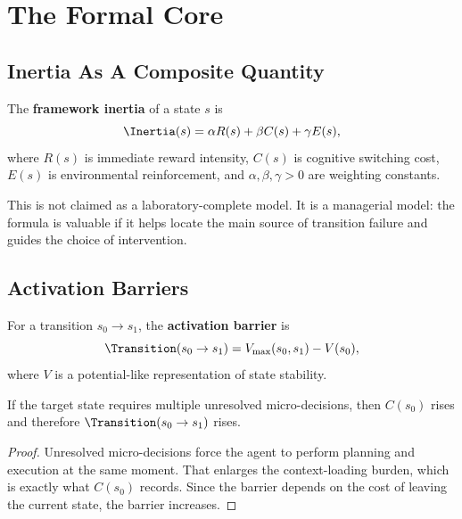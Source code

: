 \section{The Formal Core}
\label{sec:formal-core}

\subsection{Inertia As A Composite Quantity}

\begin{definition}
The \textbf{framework inertia} of a state $s$ is
\[
  \Inertia(s) = \alpha R(s) + \beta C(s) + \gamma E(s),
\]
where $R(s)$ is immediate reward intensity, $C(s)$ is cognitive switching cost,
$E(s)$ is environmental reinforcement, and $\alpha,\beta,\gamma > 0$ are
weighting constants.
\end{definition}

\begin{remark}
This is not claimed as a laboratory-complete model. It is a managerial model:
the formula is valuable if it helps locate the main source of transition
failure and guides the choice of intervention.
\end{remark}

\subsection{Activation Barriers}

\begin{definition}
For a transition $s_0 \to s_1$, the \textbf{activation barrier} is
\[
  \Transition(s_0 \to s_1) = V_{\max}(s_0,s_1) - V(s_0),
\]
where $V$ is a potential-like representation of state stability.
\end{definition}

\begin{lemma}
If the target state requires multiple unresolved micro-decisions, then
$C(s_0)$ rises and therefore $\Transition(s_0 \to s_1)$ rises.
\end{lemma}

\begin{proof}
Unresolved micro-decisions force the agent to perform planning and execution at
the same moment. That enlarges the context-loading burden, which is exactly
what $C(s_0)$ records. Since the barrier depends on the cost of leaving the
current state, the barrier increases.
\end{proof}


